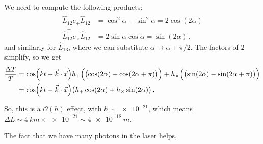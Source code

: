 \documentclass[main.tex]{subfiles}
\begin{document}
We need to compute the following products: 
%
\begin{align}
\hat{L}_{12}^{\top} e_{+} \hat{L}_{12} &= \cos^2\alpha - \sin^2\alpha =  2\cos(2 \alpha )
\\
\hat{L}_{12}^{\top} e_{ \times } \hat{L}_{12} &= 2 \sin \alpha \cos \alpha = \sin(2 \alpha )
\,,
\end{align}
%
and similarly for \(\hat{L}_{13} \), where we can substitute \(\alpha \rightarrow \alpha + \pi /2\). The factors of \(2\) simplify, so we get 
%
\begin{align}
\frac{\Delta T}{T} &= \cos(kt - \vec{k} \cdot \vec{x}) 
h_{+}\qty(  \qty(\cos(2 \alpha ) - \cos(2 \alpha  + \pi ))) + 
h_{ \times } \qty(  \qty(\sin(2 \alpha ) - \sin(2 \alpha  + \pi )))  \\
&= \cos(kt - \vec{k} \cdot \vec{x}) \qty(
h_{+}\cos(2 \alpha ) + 
h_{\times} \sin(2 \alpha ))
\,.
\end{align}

So, this is a \(\mathcal{O}(h)\) effect, with \(h \sim \num{e-21}\), which means \(\Delta L  \sim \SI{4}{km} \times \num{e-21} \sim \SI{4e-18}{m}\). 

The fact that we have many photons in the laser helps, 
\end{document}
